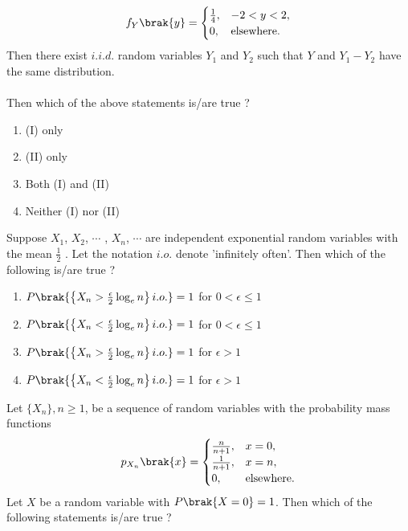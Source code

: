 \begin{align*}
    f_Y\brak{y} = \begin{cases}
        \frac{1}{4}, & -2 < y < 2, \\
        0, & \text{elsewhere}.
    \end{cases}
\end{align*}
Then there exist $i.i.d.$ random variables $Y_1$ and $Y_2$ such that $Y$ and
$Y_1 - Y_2$ have the same distribution. \\\\
Then which of the above statements is/are true ?
\begin{enumerate}
    \item (I) only
    \item (II) only
    \item Both (I) and (II)
    \item Neither (I) nor (II) \\
\end{enumerate}
\item Suppose $X_1$, $X_2$, $\cdots$ , $X_n$, $\cdots$ are independent exponential random variables with the mean $\frac{1}{2}$ . Let the notation $i.o.$ denote 'infinitely often'. Then which of the following is/are true ? 
\begin{enumerate}
    \item $P\brak{\left\{X_n > \frac{\epsilon}{2}\log_en\right\}i.o.} = 1$ for $0 < \epsilon \leq 1$
    \item $P\brak{\left\{X_n < \frac{\epsilon}{2}\log_en\right\}i.o.} = 1$ for $0 < \epsilon \leq 1$
    \item $P\brak{\left\{X_n > \frac{\epsilon}{2}\log_en\right\}i.o.} = 1$ for $\epsilon > 1$
    \item $P\brak{\left\{X_n < \frac{\epsilon}{2}\log_en\right\}i.o.} = 1$ for $\epsilon > 1$ \\ 
\end{enumerate}
\item Let $\{X_n\}, n \geq 1$, be a sequence of random variables with the probability mass functions
\begin{align*}
    p_{X_n}\brak{x} = \begin{cases}
        \frac{n}{n+1}, & x = 0, \\
        \frac{1}{n+1}, & x = n, \\
        0, & \text{elsewhere}.
    \end{cases}
\end{align*}
Let $X$ be a random variable with $P\brak{X = 0} = 1$. Then which of the following statements is/are true ? 
